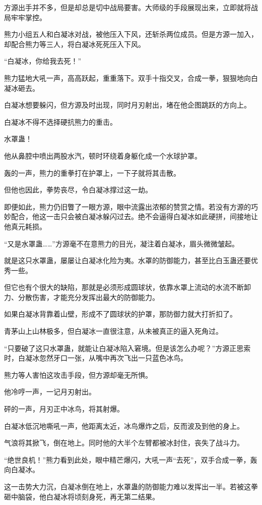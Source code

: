 \begin{this_body}
方源出手并不多，但是却总是切中战局要害。大师级的手段展现出来，立即就将战局牢牢掌控。

熊力小组五人和白凝冰对战，被他压入下风，还斩杀两位成员。但是方源一加入，却配合熊力等三人，将白凝冰死死压入下风。

“白凝冰，你给我去死！”

熊力猛地大吼一声，高高跃起，重重落下。双手十指交叉，合成一拳，狠狠地向白凝冰砸去。

白凝冰想要躲闪，但方源及时出现，同时月刃射出，堵在他企图跳跃的方向上。

白凝冰不得不选择硬抗熊力的重击。

水罩蛊！

他从鼻腔中喷出两股水汽，顿时环绕着身躯化成一个水球护罩。

轰的一声，熊力的重拳打在护罩上，一下子就将其击散。

但他也因此，拳势丧尽，令白凝冰撑过这一劫。

即便如此，熊力仍旧瞥了一眼方源，眼中流露出浓郁的赞赏之情。若没有方源的巧妙配合，他这一击只会被白凝冰躲闪过去。绝不会逼得白凝冰如此硬拼，间接地让他真元耗损。

“又是水罩蛊……”方源毫不在意熊力的目光，凝注着白凝冰，眉头微微皱起。

就是这只水罩蛊，屡屡让白凝冰化险为夷。水罩的防御能力，甚至比白玉蛊还要优秀一些。

但它也有个很大的缺陷，那就是必须形成圆球状，依靠水罩上流动的水流不断卸力、分散伤害，才能充分发挥出最大的防御能力。

如果白凝冰背靠着山壁，形成不了圆球状的护罩，那防御力就大打折扣了。

青茅山上山林极多，但白凝冰一直很注意，从未被真正的逼入死角过。

“只要破了这只水罩蛊，就能让白凝冰陷入窘境。但是该怎么办呢？”方源正思索时，白凝冰忽然牙口一张，从嘴中再次飞出一只蓝色冰鸟。

熊力等人害怕这攻击手段，但方源却毫无所惧。

他冷哼一声，一记月刃射出。

砰的一声，月刃正中冰鸟，将其射爆。

白凝冰低沉地嘶吼一声，他距离太近，冰鸟爆炸之后，反而波及到他的身上。

气浪将其掀飞，倒在地上。同时他的大半个左臂都被冰封住，丧失了战斗力。

“绝世良机！”熊力看到此处，眼中精芒爆闪，大吼一声“去死”，双手合成一拳，轰向白凝冰。

这一击势大力沉，白凝冰倒在地上，水罩蛊的防御能力难以发挥出一半。若被这拳砸中脑袋，他白凝冰将顷刻身死，再无第二结果。

\end{this_body}

